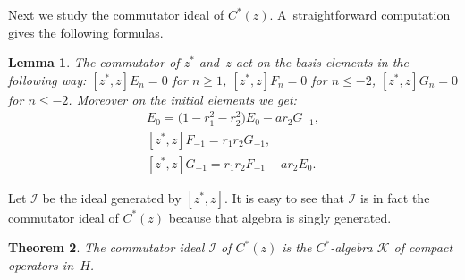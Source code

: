 \documentclass[11pt]{article}
\numberwithin{equation}{section}
\newtheorem{Theorem}{Theorem}[section]
\newtheorem{Lemma}[Theorem]{Lemma}
\begin{document}
Next we study the commutator ideal of $C^*(z)$.
A~straightforward computation gives the following formulas.

\begin{Lemma}
\label{commutator_calculation}
The commutator of $z^*$ and~$z$ act on the basis elements in the following way: $[z^*,z]E_n=0$ for $n\ge 1$,
$[z^*,z]F_n=0$ for $n\le -2$, $[z^*,z]G_n =0$ for $n\le -2$.
Moreover on the initial elements we get:
\begin{gather*}
 [z^*,z]E_0=\big(1-r_1^2-r_2^2\big)E_0-ar_2G_{-1},
\\
 [z^*,z]F_{-1} =r_1r_2G_{-1},
\\
 [z^*,z]G_{-1} =r_1r_2F_{-1}-ar_2E_0.
\end{gather*}
\end{Lemma}

Let $\mathcal{I}$ be the ideal generated by $[z^*,z]$.
It is easy to see that $\mathcal{I}$ is in fact the commutator ideal of $C^*(z)$ because that algebra is singly generated.

\begin{Theorem}%
The commutator ideal $\mathcal{I}$ of $C^*(z)$ is the $C^*$-algebra $\mathcal{K}$ of compact operators in~$H$.
\end{Theorem}
\end{document}
